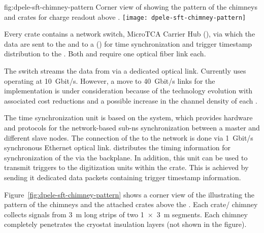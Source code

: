 \begin{dunefigure}{fig:dpele-sft-chimney-pattern}
{Corner view of  showing the pattern of the  chimneys and  crates for charge readout above .}
\texttt{[image: dpele-sft-chimney-pattern]}
\end{dunefigure}

Every  crate contains a network switch, MicroTCA Carrier Hub (), via which the data are sent to the   and to %
a () for %
time synchronization and trigger timestamp distribution to the . Both  and  require one optical fiber link each. 

The  switch streams the data from  via a dedicated optical link. Currently  uses  operating at \SI{10}{Gbit/s}. However, a move to \SI{40}{Gbit/s} links for the  implementation is under consideration because of the technology evolution with associated cost reductions and a possible increase in the channel density of each .

The  time synchronization unit is based on the  system, which provides hardware and protocols for the network-based sub-\si{\nano\s} synchronization between a master and different slave nodes. The connection of the  to the  network is done via \SI{1}{Gbit/s} synchronous Ethernet optical link.  distributes the timing information for synchronization of the  via the  backplane. In addition, this unit can be used to transmit triggers to the digitization units within the crate. This is achieved by sending it dedicated data packets containing trigger timestamp information. 

Figure~\ref{fig:dpele-sft-chimney-pattern} shows a corner view of the  illustrating the pattern of the  chimneys and the attached  crates above the . Each crate/ chimney collects signals from \SI{3}{\meter} long strips of two \SI[product-units=power]{1x3}{\meter}  segments. Each chimney completely %
penetrates the cryostat insulation layers (not shown in the figure). 


